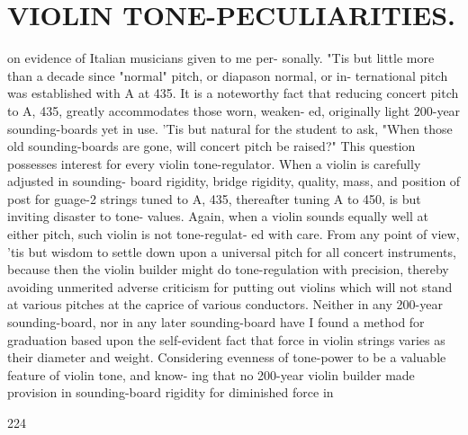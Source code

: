 \documentclass{article}
\begin{document}
\section*{VIOLIN TONE-PECULIARITIES.}
on evidence of Italian musicians given to me per- sonally. "Tis but little more than a decade since "normal" pitch, or diapason normal, or in- ternational pitch was established with A at 435. It is a noteworthy fact that reducing concert pitch to A, 435, greatly accommodates those worn, weaken- ed, originally light 200-year sounding-boards yet in use. 'Tis but natural for the student to ask, "When those old sounding-boards are gone, will concert pitch be raised?" This question possesses interest for every violin tone-regulator. When a violin is carefully adjusted in sounding- board rigidity, bridge rigidity, quality, mass, and position of post for guage-2 strings tuned to A, 435, thereafter tuning A to 450, is but inviting disaster to tone- values. Again, when a violin sounds equally well at either pitch, such violin is not tone-regulat- ed with care. From any point of view, 'tis but wisdom to settle down upon a universal pitch for all concert instruments, because then the violin builder might do tone-regulation with precision, thereby avoiding unmerited adverse criticism for putting out violins which will not stand at various pitches at the caprice of various conductors. Neither in any 200-year sounding-board, nor in any later sounding-board have I found a method for graduation based upon the self-evident fact that force in violin strings varies as their diameter and weight. Considering evenness of tone-power to be a valuable feature of violin tone, and know- ing that no 200-year violin builder made provision in sounding-board rigidity for diminished force in

224
\end{document}

